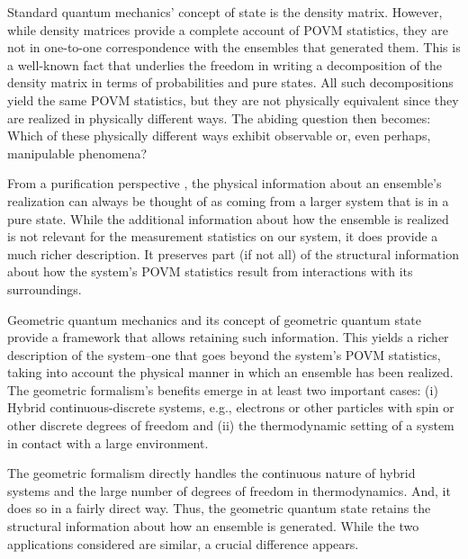 \documentclass[draft,nofootinbib,pre,twocolumn,showpacs,showkeys,preprintnumbers,floatfix]{revtex4-1}
\newcommand{\1}{\mathbbm{1}}
\begin{document}
Standard quantum mechanics' concept of state is the density matrix. However,
while density matrices provide a complete account of POVM statistics, they are
not in one-to-one correspondence with the ensembles that generated them. This
is a well-known fact that underlies the freedom in writing a decomposition of
the density matrix in terms of probabilities and pure states.  All such
decompositions yield the same POVM statistics, but they are not physically
equivalent since they are realized in physically different ways. The abiding
question then becomes: Which of these physically different ways exhibit
observable or, even perhaps, manipulable phenomena?

From a purification perspective \cite{Wilde2017}, the physical information
about an ensemble's realization can always be thought of as coming from a
larger system that is in a pure state. While the additional information about
how the ensemble is realized is not relevant for the measurement statistics on
our system, it does provide a much richer description. It preserves part (if
not all) of the structural information about how the system's POVM statistics
result from interactions with its surroundings.
 
Geometric quantum mechanics and its concept of geometric quantum state provide
a framework that allows retaining such information. This yields a richer
description of the system--one that goes beyond the system's POVM statistics, 
taking into account the physical manner in which an ensemble has been realized.
The geometric formalism's benefits emerge in at least two important cases:
(i) Hybrid continuous-discrete systems, e.g., electrons or other particles with
spin or other discrete degrees of freedom and (ii) the thermodynamic setting
of a system in contact with a large environment.

The geometric formalism directly handles the continuous nature of hybrid
systems and the large number of degrees of freedom in thermodynamics. And, it
does so in a fairly direct way. Thus, the geometric quantum state retains the 
structural information about how an ensemble is generated. While the 
two applications considered are similar, a crucial difference appears.
\end{document}
